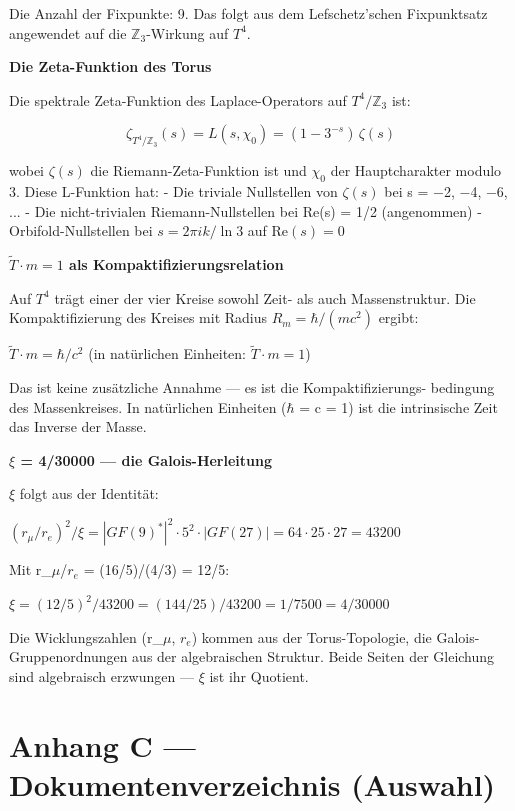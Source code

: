 \documentclass[11pt,oneside]{book}
\begin{document}
Die Anzahl der Fixpunkte: 9. Das folgt aus dem Lefschetz'schen
Fixpunktsatz angewendet auf die $\mathbb{Z}_3$-Wirkung auf $T^4$.


\textbf{Die Zeta-Funktion des Torus}


Die spektrale Zeta-Funktion des Laplace-Operators auf $T^4/\mathbb{Z}_3$ ist:


\[\zeta_{T^4/\mathbb{Z}_3}(s) = L(s,\chi_0) = (1-3^{-s})\,\zeta(s)\]


wobei $\zeta(s)$ die Riemann-Zeta-Funktion ist und $\chi_0$ der Hauptcharakter
modulo 3. Diese L-Funktion hat:
- Die triviale Nullstellen von $\zeta(s)$ bei s = $-$2, $-$4, $-$6, ...
- Die nicht-trivialen Riemann-Nullstellen bei Re(s) = 1/2 (angenommen)
- Orbifold-Nullstellen bei $s = 2\pi i k/\ln 3$ auf $\mathrm{Re}(s) = 0$


\textbf{$\tilde{T}\cdot m = 1$ als Kompaktifizierungsrelation}


Auf $T^4$ trägt einer der vier Kreise sowohl Zeit- als auch Massenstruktur.
Die Kompaktifizierung des Kreises mit Radius $R_m = \hbar/(mc^2)$ ergibt:


$\tilde{T}\cdot m = \hbar/c^2$ (in natürlichen Einheiten: $\tilde{T}\cdot m = 1$)


Das ist keine zusätzliche Annahme — es ist die Kompaktifizierungs-
bedingung des Massenkreises. In natürlichen Einheiten ($\hbar$ = c = 1)
ist die intrinsische Zeit das Inverse der Masse.


\textbf{$\xi$ = 4/30000 — die Galois-Herleitung}


$\xi$ folgt aus der Identität:


$(r_\mu/r_e)^2/\xi = |GF(9)^*|^2 \cdot 5^2 \cdot |GF(27)| = 64\cdot 25\cdot 27 = 43200$


Mit r\_$\mu$/$r_e$ = (16/5)/(4/3) = 12/5:


$\xi = (12/5)^2/43200 = (144/25)/43200 = 1/7500 = 4/30000$


Die Wicklungszahlen (r\_$\mu$, $r_e$) kommen aus der Torus-Topologie,
die Galois-Gruppenordnungen aus der algebraischen Struktur. Beide
Seiten der Gleichung sind algebraisch erzwungen — $\xi$ ist ihr Quotient.






\chapter*{Anhang C — Dokumentenverzeichnis (Auswahl)}
\end{document}
